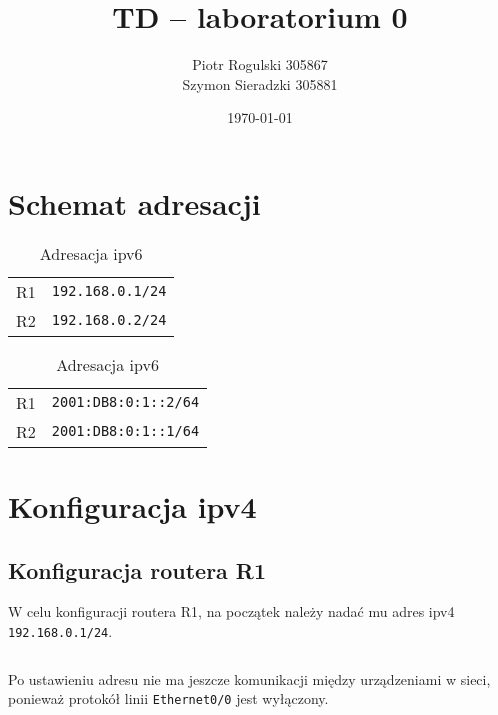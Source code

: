 \documentclass[a4paper,12pt,notitlepage]{article}
\title{\textbf{TD -- laboratorium 0}}
\author{Piotr Rogulski 305867 \\ Szymon Sieradzki 305881}
\date{\today}
\begin{document}
\maketitle


\section{Schemat adresacji}

\begin{table}[!htb]
    \begin{minipage}{.5\linewidth}
        \caption{Adresacja ipv4}
        \centering
        \begin{tabular}{c|c}
            \hline\hline
            R1 & \texttt{192.168.0.1/24} \\
            R2 & \texttt{192.168.0.2/24} \\
            \hline
        \end{tabular}
    \end{minipage}%
    \begin{minipage}{.5\linewidth}
        \caption{Adresacja ipv6}
        \centering
        \begin{tabular}{c|c}
            \hline\hline
            R1 & \texttt{2001:DB8:0:1::2/64} \\
            R2 & \texttt{2001:DB8:0:1::1/64} \\
            \hline
        \end{tabular}
    \end{minipage}
\end{table}

\section{Konfiguracja ipv4}

\subsection{Konfiguracja routera R1}

W celu konfiguracji routera R1, na początek należy nadać mu adres ipv4 \texttt{192.168.0.1/24}.%
\inputminted[label=Ustawianie adresu ipv4 dla R1, firstline=89, lastline=92]{text}{R1.txt}

Po ustawieniu adresu nie ma jeszcze komunikacji między urządzeniami w sieci, ponieważ protokół linii \texttt{Ethernet0/0} jest wyłączony.%
\inputminted[label=Włączanie protokołu linii, firstline=122, lastline=123]{text}{R1.txt}
\end{document}
